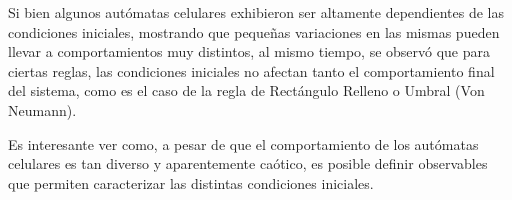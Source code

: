 Si bien algunos autómatas celulares exhibieron ser altamente dependientes de las condiciones iniciales, mostrando que pequeñas variaciones en las mismas pueden llevar a comportamientos muy distintos, al mismo tiempo, se observó que para ciertas reglas, las condiciones iniciales no afectan tanto el comportamiento final del sistema, como es el caso de la regla de Rectángulo Relleno o Umbral (Von Neumann).

Es interesante ver como, a pesar de que el comportamiento de los autómatas celulares es tan diverso y aparentemente caótico, es posible definir observables que permiten caracterizar las distintas condiciones iniciales.
